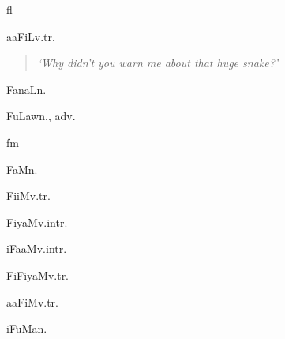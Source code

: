 \begin{multicols*}{2}
\begin{dictroot}{f}{l}
\begin{dictentry}{aaFiL}{v.tr.}
{\begin{quote}
                \textit{`Why didn't you warn me about that huge snake?'}
            \end{quote}
        }
    \end{dictentry}
    \begin{dictentry}{FanaL}{n.}\label{word:FanaL}
    \end{dictentry}
    \begin{dictentry}{FuLaw}{n., adv.}\label{word:FuLaw}
    \end{dictentry}
\end{dictroot}

\begin{dictroot}{f}{m}\label{root:F_M}
    \begin{dictentry}{FaM}{n.}\label{word:FaM}
    \end{dictentry}
    \begin{dictentry}{FiiM}{v.tr.}\label{word:FiiM}
    \end{dictentry}
    \begin{dictentry}{FiyaM}{v.intr.}\label{word:FiyaM}
    \end{dictentry}
    \begin{dictentry}{iFaaM}{v.intr.}\label{word:iFaaM}
    \end{dictentry}
    \begin{dictentry}{FiFiyaM}{v.tr.}\label{word:FiFiyaM}
    \end{dictentry}
    \begin{dictentry}{aaFiM}{v.tr.}\label{word:aaFiM}
    \end{dictentry}
    \begin{dictentry}{iFuMa}{n.}\label{word:iFuMa}
\end{dictentry}
\end{dictroot}
\end{multicols*}
